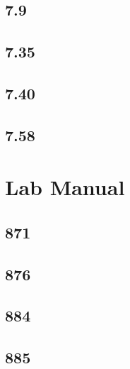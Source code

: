 \documentclass{article}
\begin{document}
\subsection{7.9}

\subsection{7.35}

\subsection{7.40}

\subsection{7.58}

\section{Lab Manual}

\subsection{871}

\subsection{876}

\subsection{884}

\subsection{885}
\end{document}
